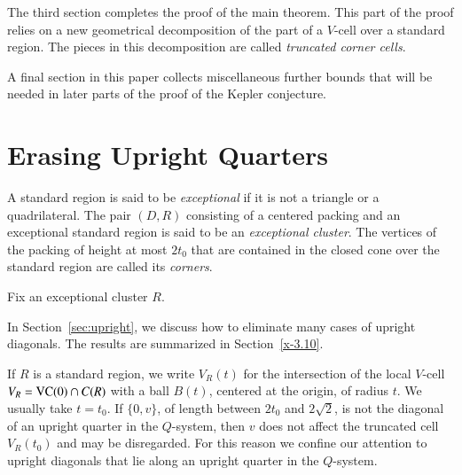 The third section completes the proof of the main theorem.  This
part of the proof relies on a new geometrical decomposition of the
part of a $V$-cell over a standard region. The pieces in this
decomposition are called {\it truncated corner cells}.

A final section in this paper collects miscellaneous further
bounds that will be needed in later parts of the proof of the
Kepler conjecture.






\section{Erasing Upright Quarters} %

\begin{definition}
A standard region is said to be {\it exceptional\/} if it is not a
triangle or a quadrilateral.  The pair $(D,R)$ consisting of a
centered packing and an exceptional standard region is said to be
an {\it exceptional cluster}.  The vertices of the packing of
height at most $2t_0$ that are contained in the closed cone over
the standard region are called its {\it corners}.
\end{definition}

Fix an exceptional cluster $R$. 

In Section~\ref{sec:upright}, we discuss how to eliminate many
cases of upright diagonals. The results are summarized in
Section~\ref{x-3.10}.

If $R$ is a standard region, we write $V_R(t)$ for the
intersection of the local $V$-cell $V_R = {\operatorname{VC}}(0)\cap C(R)$
with a ball $B(t)$, centered at the origin, of radius $t$.  We
usually take $t=t_0$. If $\{0,v\}$, of length between $2t_0$ and
$2\sqrt{2}$, is not the diagonal of an upright quarter in the
$Q$-system, then $v$ does not affect the truncated cell $V_R(t_0)$
and may be disregarded. For this reason we confine our attention
to upright diagonals that lie along an upright quarter in the
$Q$-system.



